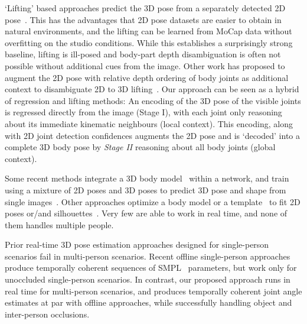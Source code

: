 \documentclass[acmtog,authorversion]{acmart}
\begin{document}
`Lifting' based approaches predict the 3D pose from a separately detected 2D pose~\cite{martinez20173dbaseline}. This has the advantages that 2D pose datasets are easier to obtain in natural environments, and the lifting can be learned from MoCap data without overfitting on the studio conditions. While this establishes a surprisingly strong baseline, lifting is ill-posed and body-part depth disambiguation is often not possible without additional cues from the image. Other work has proposed to augment the 2D pose with relative depth ordering of body joints as additional context to disambiguate 2D to 3D lifting~\cite{posebits_cvpr14,pavlakos2018ordinal}.
Our approach can be seen as a hybrid of regression and lifting methods: An encoding of the 3D pose of the visible joints is regressed directly from the image (Stage I), with each joint only reasoning about its immediate kinematic neighbours (local context). This encoding, along with 2D joint detection confidences augments the 2D pose and is `decoded' into a complete 3D body pose by \textit{Stage II} reasoning about all body joints (global context).


Some recent methods integrate a 3D body model~\cite{smpl2015loper} within a network, and train using a mixture of 2D poses and 3D poses to predict 3D pose and shape from single images~\cite{omran2018neural,pavlakos2018humanshape,kanazawa2018endtoend,tung2017self}. Other approaches optimize a body model or a template~\cite{xu2018monoperfcap,habermann2019TOG} to fit 2D poses or/and silhouettes~\cite{bhatnagar2019mgn,thiemo2018,thiemo2018_3DV,alldieck19cvpr,bogo_smpl_eccv16,Lassner:UP:2017,kolotouros2019convolutional,kolotouros2019learning,guler2019holopose}. Very few are able to work in real time, and none of them handles multiple people.


Prior real-time 3D pose estimation approaches \cite{VNect_SIGGRAPH2017} designed for single-person scenarios fail in multi-person scenarios. Recent offline single-person approaches~\cite{humanMotionKanazawa19} produce temporally coherent sequences of SMPL~ parameters, but work only for unoccluded single-person scenarios. In contrast, our proposed approach runs in real time for multi-person scenarios, and produces temporally coherent joint angle estimates at par with offline approaches, while successfully handling object and inter-person occlusions. 
\end{document}
